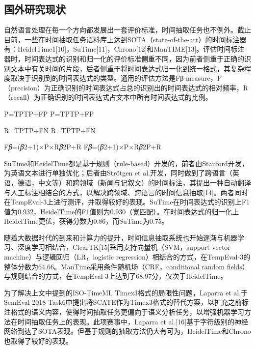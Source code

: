 \subsection{国外研究现状}

自然语言处理在每一个方向都发展出一套评价标准，时间抽取任务也不例外。截止目前，一些在时间抽取任务语料库上达到SOTA（state-of-the-art）的时间标注器有：HeidelTime1[10]，SuTime[11]，Chrono[12]和ManTIME[13]。评估时间标注器时，时间表达式的识别和归一化的评价标准侧重不同，因为前者侧重于正确的识别文本中有关时间的片段，后者侧重于将时间表达式归一化到统一格式，其复杂程度取决于识别到的时间表达式的类型。通用的评估方法是Fβ-measure，P（precision）为正确识别的时间表达式占总的识别出的时间表达式的相对频率，R（recall）为正确识别的时间表达式占文本中所有时间表达式的比例。

P=TPTP+FP
P=TPTP+FP



R=TPTP+FN
R=TPTP+FN



F𝛽=(𝛽2+1)×P×R𝛽2P+R
F𝛽=(𝛽2+1)×P×R𝛽2P+R





SuTime和HeidelTime都是基于规则（rule-based）开发的，前者由Stanford开发，为英语文本进行单独优化；后者由Strötgen et al.开发，同时做到了跨语言（英语，德语，中文等）和跨领域（新闻与记叙文）的时间标注，其提出一种自动翻译与人工标注相结合的方式，以解决跨领域、跨语言的时间信息抽取[14]。两者同时在TempEval-3上进行测评，并取得较好的表现。SuTime在时间表达式的识别上F1值为0.932，HeidelTime的F1值则为0.930（宽匹配）。在时间表达式的归一化上HeidelTime更优，获得分数为0.86，而SuTime为0.75。

随着大数据时代的到来和计算力的提升，时间信息抽取系统也开始逐渐与机器学习、深度学习相结合，ClearTK[15]采用支持向量机（SVM，support vector machine）与逻辑回归（LR，logistic regression）相结合的方式，在TempEval-3的整体分数为64.66。ManTime采用条件随机场（CRF，conditional random fields）与规则结合的方式，在TempEval-3上达到了68.97分，仅次于HeidelTime。

为了解决上文中提到的ISO-TimeML Timex3格式的局限性问题，Laparra et al.于SemEval 2018 Task6中提出将SCATE作为Timex3格式的替代方案，以扩充之前标注格式的语义内容，使得时间抽取任务更偏向于语义分析任务，以增强机器学习方法在时间抽取任务上的表现。此项赛事中，Laparra et al.[16]基于字符级别的神经网络到达了SOTA表现。但基于规则的抽取方法仍大有可为，HeidelTime和Chrono也取得了较好的表现。

